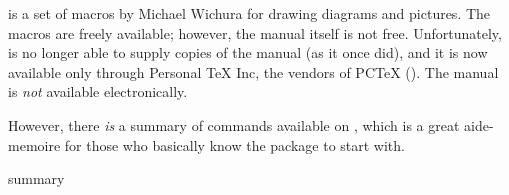 
\pictex{} is a set of macros by Michael Wichura for drawing diagrams
and pictures. The
macros are freely available; however, the
\pictex{} manual itself is not free.
Unfortunately,  is no longer able to supply copies of the
manual (as it once did), and it is now available only through Personal
\TeX{} Inc, the vendors of PC\TeX{} ().  The
manual is \emph{not} available electronically.

However, there \emph{is} a summary of \pictex{} commands available on
, which is a great aide-memoire for those who basically
know the package to start with.
\begin{ctanrefs}
\item[\pictex{}]
\item[\pictex{} summary]
\end{ctanrefs}
